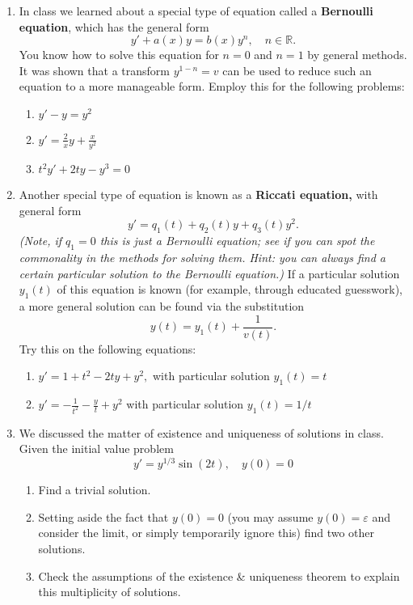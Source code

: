 \documentclass[a4paper,12pt,leqno]{article}
\begin{document}

\begin{enumerate}
\item In class we learned about a special type of equation called a \textbf{Bernoulli equation}, which has the general form
\[ y' + a(x) y = b(x) y^n, \quad n \in \mathbb{R}.\]
You know how to solve this equation for $n = 0$ and $n=1$ by general methods. It was shown that a transform $y^{1-n} = v$ can be used to reduce such an equation to a more manageable form. Employ this for the following problems:
\begin{enumerate}
\item $y' - y = y^2$
\item $y' = \frac{2}{x}y + \frac{x}{y^2}$
\item $t^2 y' + 2ty - y^3 = 0$
\end{enumerate}
\item Another special type of equation is known as a \textbf{Riccati equation,} with general form 
\[ y' = q_1(t) + q_2(t)y + q_3(t)y^2. \] \emph{(Note, if $q_1 = 0$ this is just a Bernoulli equation; see if you can spot the commonality in the methods for solving them. Hint: you can always find a certain particular solution to the Bernoulli equation.)} If a particular solution $y_1(t)$ of this equation is known (for example, through educated guesswork), a more general solution can be found via the substitution 
\[ y(t) = y_1(t) + \frac{1}{v(t)}. \]
Try this on the following equations:
\begin{enumerate}
\item $y' = 1+t^2 - 2ty + y^2,$ with particular solution $y_1(t) = t$
\item $y' = -\frac{1}{t^2} - \frac{y}{t} +y^2$ with particular solution $y_1(t) = 1/t$
\end{enumerate}
\item We discussed the matter of existence and uniqueness of solutions in class. Given the initial value problem
\[ y' = y^{1/3} \sin(2t), \quad y(0) = 0 \]
\begin{enumerate}
\item Find a trivial solution.
\item Setting aside the fact that $y(0) = 0$ (you may assume $y(0) = \varepsilon$ and consider the limit, or simply temporarily ignore this) find two other solutions.
\item Check the assumptions of the existence \& uniqueness theorem to explain this multiplicity of solutions.
\end{enumerate}
\end{enumerate}
\end{document}
